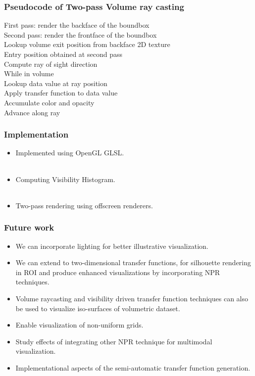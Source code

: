 \documentclass{beamer}
\begin{document}
\begin{frame}[fragile] %
\frametitle{Pseudocode of Two-pass Volume ray casting}
First pass: render the backface of the boundbox  \\
Second pass: render the frontface of the boundbox \\
Lookup volume exit position from backface 2D texture  \\
Entry position obtained at second pass    \\
Compute ray of sight direction  \\
While in volume  \\
\hspace{35pt} Lookup data value at ray position \\ 
\hspace{35pt} Apply transfer function to data value \\ 
\hspace{35pt} Accumulate color and opacity  \\
\hspace{35pt} Advance along ray\\
\end{frame}



\begin{frame}
\frametitle{Implementation }
\begin{itemize}
\item Implemented using OpenGL GLSL. \\ $ $
\item Computing Visibility Histogram. \\ $ $
\item Two-pass rendering using offscreen renderers. 
\end{itemize}
\end{frame}



\begin{frame}
\frametitle{Future work }
\begin{itemize}
\item We can incorporate lighting for better illustrative visualization. 
\item We can extend to two-dimensional transfer functions, for silhouette rendering in ROI and produce enhanced visualizations by incorporating NPR techniques. 
\item Volume raycasting and visibility driven transfer function techniques can also be used to visualize iso-surfaces of volumetric dataset. 
\item Enable visualization of non-uniform grids.
\item Study effects of integrating other NPR technique for multimodal visualization. 
\item Implementational aspects of the semi-automatic transfer function generation.
\end{itemize}
\end{frame}
\end{document}
